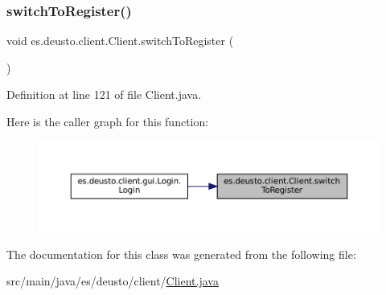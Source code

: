 \subsubsection{\texorpdfstring{switchToRegister()}{switchToRegister()}}
{\footnotesize\ttfamily void es.\+deusto.\+client.\+Client.\+switch\+To\+Register (\begin{DoxyParamCaption}{ }\end{DoxyParamCaption})}



Definition at line 121 of file Client.\+java.

Here is the caller graph for this function\+:
\nopagebreak
\begin{figure}[H]
\begin{center}
\leavevmode
\includegraphics[width=350pt]{classes_1_1deusto_1_1client_1_1_client_a8b292db7d6ec16eaa53b224bb7a33ab4_icgraph}
\end{center}
\end{figure}


The documentation for this class was generated from the following file\+:\begin{DoxyCompactItemize}
\item 
src/main/java/es/deusto/client/\mbox{\hyperlink{_client_8java}{Client.\+java}}\end{DoxyCompactItemize}
